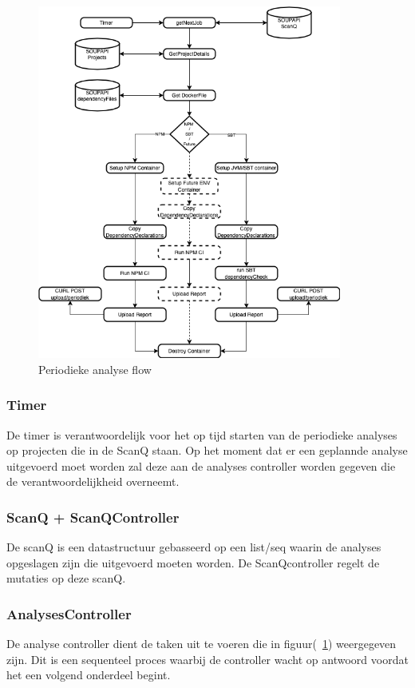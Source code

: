 \begin{figure}[H]
    \myfloatalign
    \includegraphics[width=10cm]{gfx/SOUPAPI-Periodic Analysis}
    \caption{Periodieke analyse flow}
    \label{fig:PeriodicAnalysis}
\end{figure}

\subsubsection{Timer}
De timer is verantwoordelijk voor het op tijd starten van de periodieke analyses op projecten die in de ScanQ staan. Op het moment dat er een geplannde analyse uitgevoerd moet worden zal deze aan de analyses controller worden gegeven die de verantwoordelijkheid overneemt.
\subsubsection{ScanQ + ScanQController}
De scanQ is een datastructuur gebasseerd op een list/seq waarin de analyses opgeslagen zijn die uitgevoerd moeten worden. De ScanQcontroller regelt de mutaties op deze scanQ.
\subsubsection{AnalysesController}
De analyse controller dient de taken uit te voeren die in figuur(~\ref{fig:PeriodicAnalysis}) weergegeven zijn. Dit is een sequenteel proces waarbij de controller wacht op antwoord voordat het een volgend onderdeel begint.

